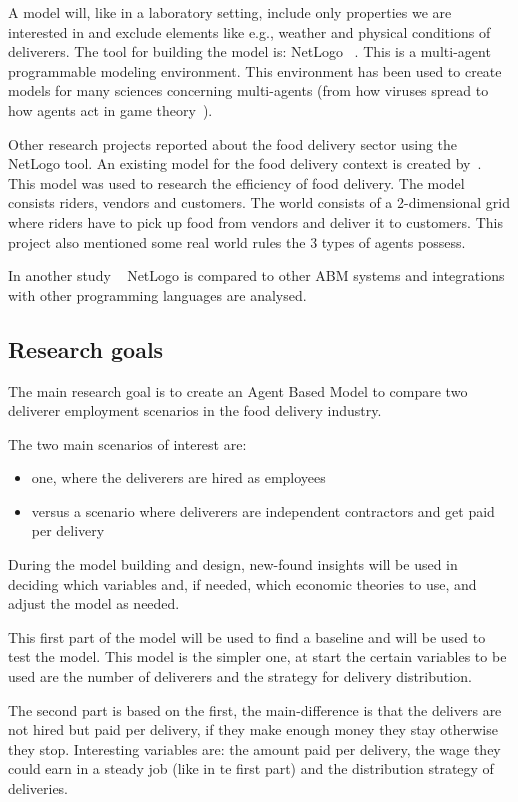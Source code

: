 A model will, like in a laboratory setting, include only properties we are interested in and exclude elements like e.g., weather and physical conditions of deliverers.
The tool for building the model is: NetLogo ~\cite{NetLogo2024}.
This is a multi-agent programmable modeling environment.
This environment has been used to create models for many sciences concerning multi-agents (from how viruses spread to how agents act in game theory~\cite{r2019agent}).

Other research projects reported about the food delivery sector using the NetLogo tool.
An existing model for the food delivery context is created by~\cite{ismail2024software}.
This model was used to research the efficiency of food delivery.
The model consists riders, vendors and customers.
The world consists of a 2-dimensional grid where riders have to pick up food from vendors and deliver it to customers.
This project also mentioned some real world rules the 3 types of agents possess.

In another study ~\cite{antelmi2024reliable} NetLogo is compared to other ABM systems and integrations with other programming languages are analysed.

\subsection{Research goals}
The main research goal is to create an Agent Based Model to compare two deliverer employment scenarios in the food delivery industry.

The two main scenarios of interest are:
\begin{itemize}
    \item one, where the deliverers are hired as employees
    \item versus a scenario where deliverers are independent contractors and get paid per delivery
\end{itemize}

During the model building and design, new-found insights will be used in deciding which variables and, if needed, which economic theories to use, and adjust the model as needed.

This first part of the model will be used to find a baseline and will be used to test the model.
This model is the simpler one, at start the certain variables to be used are the number of deliverers and the strategy for delivery distribution.

The second part is based on the first, the main-difference is that the delivers are not hired but paid per delivery, if they make enough money they stay otherwise they stop.
Interesting variables are: the amount paid per delivery, the wage they could earn in a steady job (like in te first part) and the distribution strategy of deliveries.

